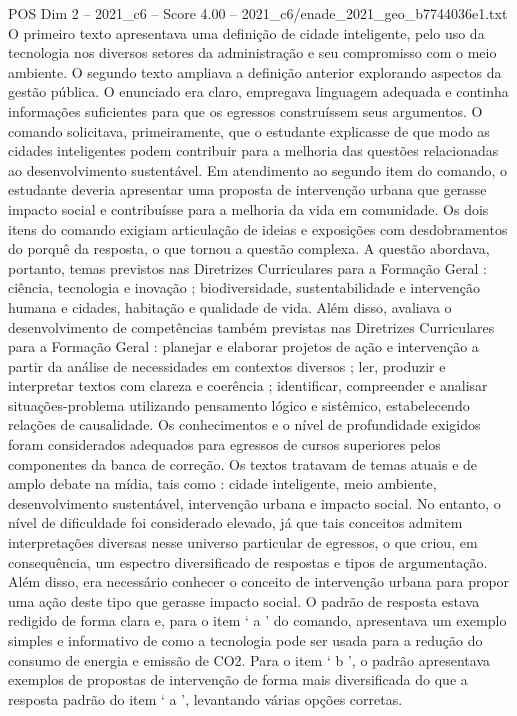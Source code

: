 \begin{textsample}{POS Dim 2 – 2021\_c6 – Score 4.00 – 2021\_c6/enade\_2021\_geo\_b7744036e1.txt}
O primeiro texto apresentava uma definição de cidade inteligente, pelo uso da tecnologia nos diversos setores da administração e seu compromisso com o meio ambiente.
O segundo texto ampliava a definição anterior explorando aspectos da gestão pública.
O enunciado era claro, empregava linguagem adequada e continha informações suficientes para que os egressos construíssem seus argumentos.
O comando solicitava, primeiramente, que o estudante explicasse de que modo as cidades inteligentes podem contribuir para a melhoria das questões relacionadas ao desenvolvimento sustentável.
Em atendimento ao segundo item do comando, o estudante deveria apresentar uma proposta de intervenção urbana que gerasse impacto social e contribuísse para a melhoria da vida em comunidade.
Os dois itens do comando exigiam articulação de ideias e exposições com desdobramentos do porquê da resposta, o que tornou a questão complexa.
A questão abordava, portanto, temas previstos nas Diretrizes Curriculares para a Formação Geral : ciência, tecnologia e inovação ; biodiversidade, sustentabilidade e intervenção humana e cidades, habitação e qualidade de vida.
Além disso, avaliava o desenvolvimento de competências também previstas nas Diretrizes Curriculares para a Formação Geral : planejar e elaborar projetos de ação e intervenção a partir da análise de necessidades em contextos diversos ; ler, produzir e interpretar textos com clareza e coerência ; identificar, compreender e analisar situações-problema utilizando pensamento lógico e sistêmico, estabelecendo relações de causalidade.
Os conhecimentos e o nível de profundidade exigidos foram considerados adequados para egressos de cursos superiores pelos componentes da banca de correção.
Os textos tratavam de temas atuais e de amplo debate na mídia, tais como : cidade inteligente, meio ambiente, desenvolvimento sustentável, intervenção urbana e impacto social.
No entanto, o nível de dificuldade foi considerado elevado, já que tais conceitos admitem interpretações diversas nesse universo particular de egressos, o que criou, em consequência, um espectro diversificado de respostas e tipos de argumentação.
Além disso, era necessário conhecer o conceito de intervenção urbana para propor uma ação deste tipo que gerasse impacto social.
O padrão de resposta estava redigido de forma clara e, para o item ‘ a ’ do comando, apresentava um exemplo simples e informativo de como a tecnologia pode ser usada para a redução do consumo de energia e emissão de CO2.
Para o item ‘ b ’, o padrão apresentava exemplos de propostas de intervenção de forma mais diversificada do que a resposta padrão do item ‘ a ’, levantando várias opções corretas.

\end{textsample}
